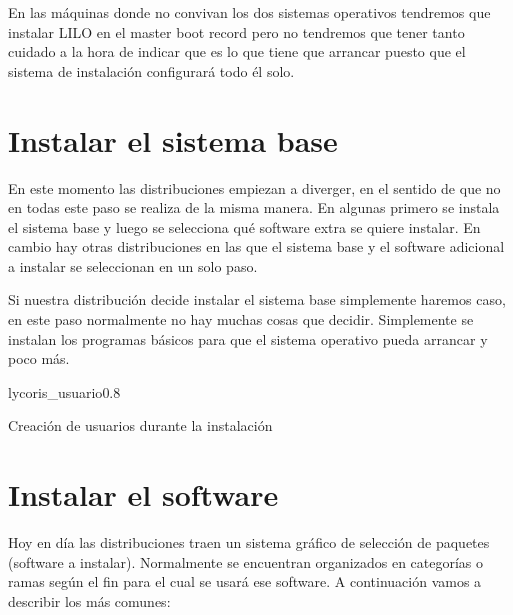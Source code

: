 En  las  máquinas  donde  no  convivan  los  dos  sistemas  operativos
tendremos que instalar LILO en el master boot record pero no tendremos
que tener tanto cuidado  a la hora de indicar que es  lo que tiene que
arrancar  puesto que  el sistema  de instalación  configurará todo  él
solo.


\section{Instalar el sistema base}

En este momento las distribuciones  empiezan a diverger, en el sentido
de que no en todas este paso se realiza de la misma manera. En algunas
primero se instala el sistema base  y luego se selecciona qué software
extra se  quiere instalar. En  cambio hay otras distribuciones  en las
que el sistema base y el  software adicional a instalar se seleccionan
en un solo paso.

Si nuestra  distribución decide  instalar el sistema  base simplemente
haremos  caso,  en este  paso  normalmente  no  hay muchas  cosas  que
decidir. Simplemente  se instalan  los programas  básicos para  que el
sistema operativo pueda arrancar y poco más.

\begin{figura}{lycoris_usuario}{0.8}
\caption{Creación de usuarios durante la instalación}
\end{figura}


\section{Instalar el software}

Hoy en día las distribuciones traen un sistema gráfico de selección de
paquetes (software a instalar).  Normalmente se encuentran organizados
en categorías o ramas según el fin para el cual se usará ese software.
A continuación vamos a describir los más comunes:

